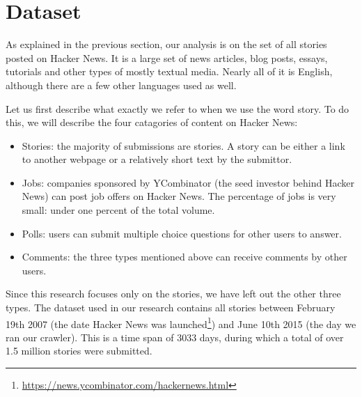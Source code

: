 \section{Dataset}
As explained in the previous section, our analysis is on the set of all stories posted on Hacker News. It is a large set of news articles, blog posts, essays, tutorials and other types of mostly textual media. Nearly all of it is English, although there are a few other languages used as well.

Let us first describe what exactly we refer to when we use the word story. To do this, we will describe the four catagories of content on Hacker News:
\begin{itemize}
\item Stories: the majority of submissions are stories. A story can be either a link to another webpage or a relatively short text by the submittor.
\item Jobs: companies sponsored by YCombinator (the seed investor behind Hacker News) can post job offers on Hacker News. The percentage of jobs is very small: under one percent of the total volume.
\item Polls: users can submit multiple choice questions for other users to answer.
\item Comments: the three types mentioned above can receive comments by other users.
\end{itemize}

Since this research focuses only on the stories, we have left out the other three types. The dataset used in our research contains all stories between February 19th 2007 (the date Hacker News was launched\footnote{\url{https://news.ycombinator.com/hackernews.html}}) and June 10th 2015 (the day we ran our crawler). This is a time span of 3033 days, during which a total of over 1.5 million stories were submitted.

